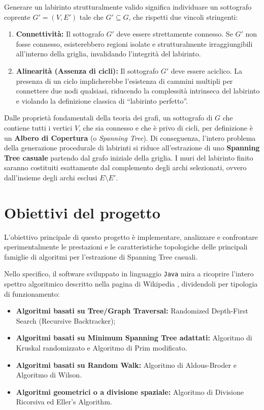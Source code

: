 \documentclass[12pt, a4paper]{article}
\begin{document}
	Generare un labirinto strutturalmente valido significa individuare un sottografo coprente $G' = (V, E')$ tale che $G' \subseteq G$, che rispetti due vincoli stringenti:
	\begin{enumerate}
		\item \textbf{Connettività:} Il sottografo $G'$ deve essere strettamente connesso. Se $G'$ non fosse connesso, esisterebbero regioni isolate e strutturalmente irraggiungibili all'interno della griglia, invalidando l'integrità del labirinto.
		\item \textbf{Alinearità (Assenza di cicli):} Il sottografo $G'$ deve essere aciclico. La presenza di un ciclo implicherebbe l'esistenza di cammini multipli per connettere due nodi qualsiasi, riducendo la complessità intrinseca del labirinto e violando la definizione classica di ``labirinto perfetto''.
	\end{enumerate}
	
	Dalle proprietà fondamentali della teoria dei grafi, un sottografo di $G$ che contiene tutti i vertici $V$, che sia connesso e che è privo di cicli, per definizione è un \textbf{Albero di Copertura} (o \textit{Spanning Tree}). Di conseguenza, l'intero problema della generazione procedurale di labirinti si riduce all'estrazione di uno \textbf{Spanning Tree casuale} partendo dal grafo iniziale della griglia. I muri del labirinto finito saranno costituiti esattamente dal complemento degli archi selezionati, ovvero dall'insieme degli archi esclusi $E \setminus E'$.
	
	\section{Obiettivi del progetto}
	L'obiettivo principale di questo progetto è implementare, analizzare e confrontare sperimentalmente le prestazioni e le caratteristiche topologiche delle principali famiglie di algoritmi per l'estrazione di Spanning Tree casuali. 
	
	Nello specifico, il software sviluppato in linguaggio \texttt{Java} mira a ricoprire l'intero spettro algoritmico descritto nella pagina di Wikipedia \cite{wiki_maze}, dividendoli per tipologia di funzionamento:
	\begin{itemize}
		\item \textbf{Algoritmi basati su Tree/Graph Traversal:} Randomized Depth-First Search (Recursive Backtracker);
		\item \textbf{Algoritmi basati su Minimum Spanning Tree adattati:} Algoritmo di Kruskal randomizzato e Algoritmo di Prim modificato.
		\item \textbf{Algoritmi basati su Random Walk:} Algoritmo di Aldous-Broder e Algoritmo di Wilson.
		\item \textbf{Algoritmi geometrici o a divisione spaziale:} Algoritmo di Divisione Ricorsiva ed Eller's Algorithm.
	\end{itemize}
	
\end{document}
